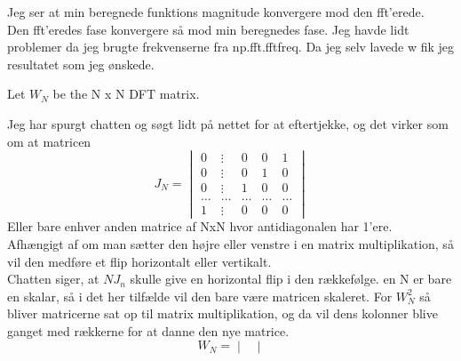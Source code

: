 \begin{Opgaver}
\begin{kapitel}
\begin{Opgave}
            \begin{UnderOpgave}[Repeat part (b) using N = 100.]
            \end{UnderOpgave}      
            Jeg ser at min beregnede funktions magnitude konvergere mod den fft'erede. \\
            Den fft'eredes fase konvergere så mod min beregnedes fase.
            \color{teal} Jeg havde lidt problemer da jeg brugte frekvenserne fra np.fft.fftfreq. Da jeg selv lavede w fik jeg resultatet som jeg ønskede. 
            \color{black}
        \end{Opgave}
        \begin{Opgave}
            Let $W_N$ be the N x N DFT matrix.
            \begin{UnderOpgave}
                Jeg har spurgt chatten og søgt lidt på nettet for at eftertjekke, og det virker som om at matricen 
                \[ J_N = 
                    \begin{vmatrix}
                        0     & \vdots & 0     & 0     & 1 \\
                        0     & \vdots & 0     & 1     & 0 \\
                        0     & \vdots & 1     & 0     & 0 \\
                        \dots & \dots  & \dots & \dots & \dots \\
                        1     & \vdots & 0     & 0     & 0
                    \end{vmatrix}
                \]
                Eller bare enhver anden matrice af NxN hvor antidiagonalen har 1'ere. \\
                Afhængigt af om man sætter den højre eller venstre i en matrix multiplikation, så vil den medføre et flip horizontalt eller vertikalt. \\
                Chatten siger, at $N J_n$ skulle give en horizontal flip i den rækkefølge. 
                en N er bare en skalar, så i det her tilfælde vil den bare være matricen skaleret. 
                For $W_N^2$ så bliver matricerne sat op til matrix multiplikation, og da vil dens kolonner blive ganget med rækkerne for at danne den nye matrice.
                \[ W_N = 
                    \begin{vmatrix}

\end{vmatrix}\]
\end{UnderOpgave}
\end{Opgave}
\end{kapitel}
\end{Opgaver}
